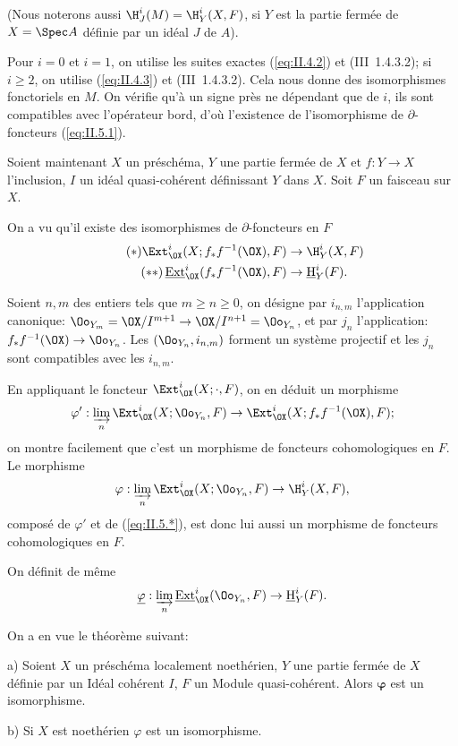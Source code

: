 \noindent
(Nous noterons aussi $\H_J^i(M)=\H_Y^i(X, F)$, si $Y$ est la partie ferm\'ee de $X=\Spec A$ d\'efinie par un id\'eal $J$ de $A$).

Pour $i=0$ et $i=1$, on utilise les suites exactes (\ref{eq:II.4.2}) et (\EGA III~1.4.3.2); si $i\geq2$, on utilise (\ref{eq:II.4.3}) et (\EGA III~1.4.3.2). Cela nous donne des isomorphismes fonctoriels en $M$. On v\'erifie qu'\`a un signe pr\`es ne d\'ependant que de $i$, ils sont compatibles avec l'op\'erateur bord, d'o\`u l'existence de l'isomorphisme de $\partial$-foncteurs (\ref{eq:II.5.1}).

Soient maintenant $X$ un pr\'esch\'ema, $Y$ une partie ferm\'ee de $X$ et $f:Y\to X$ l'inclusion, $I$ un id\'eal quasi-coh\'erent d\'efinissant $Y$ dans $X$. Soit $F$ un faisceau sur $X$.

On a vu qu'il existe des isomorphismes de $\partial$-foncteurs en $F$
\begin{align}
\label{eq:II.5.*} \tag{$*$} \Ext_{\OX}^i(X;f_{*}f^{-1}(\OX), F) &\to \H_Y^i(X, F) \\
\label{eq:II.5.**} \tag{$**$} \mathop{\underline{\mathrm{Ext}}}\nolimits_{\OX}^i(f_{*}f^{-1}(\OX), F) &\to \mathop{\underline{\mathrm{H}}}\nolimits_Y^i(F).
\end{align}

Soient $n, m$ des entiers tels que $m\geq n\geq 0$, on d\'esigne par $i_{n, m}$ l'application canonique: $\Oo_{Y_m}=\OX/I^{m+1} \to\OX/I^{n+1}=\Oo_{Y_n}$, et par $j_n$ l'application: $f_{*}f^{-1}(\OX)\to\Oo_{Y_n}$. Les $(\Oo_{Y_n}, i_{n, m})$ forment un syst\`eme projectif et les $j_n$ sont compatibles avec les $i_{n, m}$.

En appliquant le foncteur $\Ext_{\OX}^i(X;\cdot, F)$, on en d\'eduit un morphisme
$$
\varphi': \varinjlim_{n} \Ext_{\OX}^i(X;\Oo_{Y_n}, F) \to \Ext_{\OX}^i(X;f_{*}f^{-1}(\OX), F);
$$
on montre facilement que c'est un morphisme de foncteurs cohomologiques en $F$. Le morphisme
$$
\varphi: \varinjlim_{n} \Ext_{\OX}^i(X;\Oo_{Y_n}, F) \to \H_Y^i(X, F),
$$
compos\'e de $\varphi'$ et de (\ref{eq:II.5.*}), est donc lui aussi un morphisme de foncteurs cohomologiques en $F$.

\enlargethispage{\baselineskip}%
On d\'efinit de m\^eme
$$
\underline{\varphi}: \varinjlim_{n} \mathop{\underline{\mathrm{Ext}}}\nolimits_{\OX}^i(\Oo_{Y_n}, F) \to {\mathop{\underline{\mathrm{H}}}\nolimits}_Y^i(F).
$$

On a en vue le th\'eor\`eme suivant:

\begin{suptheoreme} \label{II.6} \textup{a)}
Soient $X$ un pr\'esch\'ema localement noeth\'erien, $Y$ une partie ferm\'ee de $X$ d\'efinie par un Id\'eal coh\'erent $I$, $F$ un Module quasi-coh\'erent. Alors $\boldsymbol{\varphi}$ est un isomorphisme.

\textup{b)} Si $X$ est noeth\'erien $\varphi$ est un isomorphisme.
\end{suptheoreme}

